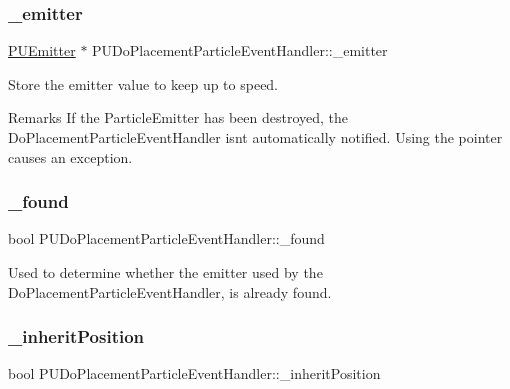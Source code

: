 \subsubsection{\texorpdfstring{\+\_\+emitter}{\_emitter}}
{\footnotesize\ttfamily \hyperlink{classPUEmitter}{P\+U\+Emitter} $\ast$ P\+U\+Do\+Placement\+Particle\+Event\+Handler\+::\+\_\+emitter\hspace{0.3cm}{\ttfamily [protected]}}

Store the emitter value to keep up to speed. \begin{DoxyRemark}{Remarks}
If the Particle\+Emitter has been destroyed, the Do\+Placement\+Particle\+Event\+Handler isn\textquotesingle{}t automatically notified. Using the pointer causes an exception. 
\end{DoxyRemark}
\mbox{\label{classPUDoPlacementParticleEventHandler_a7f1278d9ab7b70bdbe4630fad0e01f45}} 
\subsubsection{\texorpdfstring{\+\_\+found}{\_found}}
{\footnotesize\ttfamily bool P\+U\+Do\+Placement\+Particle\+Event\+Handler\+::\+\_\+found\hspace{0.3cm}{\ttfamily [protected]}}

Used to determine whether the emitter used by the Do\+Placement\+Particle\+Event\+Handler, is already found. \mbox{\label{classPUDoPlacementParticleEventHandler_aab095d9da755c02f829ffee72589f7dd}} 
\subsubsection{\texorpdfstring{\+\_\+inherit\+Position}{\_inheritPosition}}
{\footnotesize\ttfamily bool P\+U\+Do\+Placement\+Particle\+Event\+Handler\+::\+\_\+inherit\+Position\hspace{0.3cm}{\ttfamily [protected]}}


